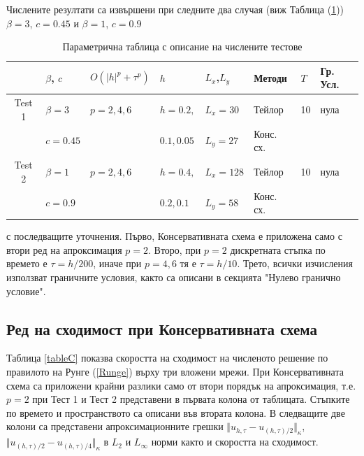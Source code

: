 \documentclass{article}
\newcommand{\rf}[1]{(\ref{#1})}
\begin{document}
Числените резултати са извършени при следните два случая (виж Таблица \rf{tableP}) $\beta = 3$, $c=0.45$ и $\beta = 1$, $c=0.9$ \begin{table}
\centering
\small
		\begin{tabular}{||c|l|l|l|l|l|l|l||}
			\hline
			\hline
                                            &    $\beta$, $c$                              & $O(|h|^p+\tau^p)$   &      $h$                                & $L_x$,$L_y$                              &  Методи & $T$      & Гр. Усл.  \\
   			\hline 
					\hline
           Test 1                        &      $\beta = 3$     &      $p=2, 4, 6$    &    $h=0.2,$       & $L_x = 30$                & Тейлор &                10    &    нула  \\
                                             &      $c=0.45$         &                             &    $ 0.1, 0.05$   & $L_y=27$                  &  Конс. сх. &                &            \\
	   \hline
			\hline 
           Test 2                        &      $\beta = 1$     &      $p=2, 4, 6$    &     $h=0.4,$       & $L_x = 128$         & Тейлор  &               10    &   нула  \\
                                             &      $c=0.9$           &                             &      $0.2, 0.1$     & $L_y=58$              & Конс. сх.  &                   &     \\
	   \hline
			\hline 
		\end{tabular}
\caption{Параметрична таблица с описание на числените тестове}
\label{tableP}
\end{table}
с последващите уточнения. Първо, Консервативната схема е приложена само с втори ред на апроксимация  $p=2$. Второ, при $p=2$ дискретната стъпка по времето е 
 $\tau=h/200$, иначе при $p=4, 6$ тя е $\tau = h/10$. Трето, всички изчисления използват граничните условия, както са описани в секцията "Нулево гранично условие".

\subsection{Ред на сходимост при Консервативната схема}

Таблица \ref{tableC} показва скоростта на сходимост на численото решение по правилото на Рунге \rf{Runge} върху три вложени мрежи. При Консервативната схема са приложени крайни разлики само от втори порядък на апроксимация, т.е. $p=2$ при Тест 1 и Тест 2 представени в първата колона от таблицата. Стъпките по времето и пространството са описани във втората колона. В следващите две колони са представени апроксимационните грешки  $\Vert u_{h,\tau} - u_{(h,\tau)/2} \Vert_\kappa$, $\Vert  u_{(h,\tau)/2} - u_{(h,\tau)/4} \Vert_\kappa$ в $L_2$ и $L_{\infty}$ норми както и скоростта на сходимост.
\end{document}

